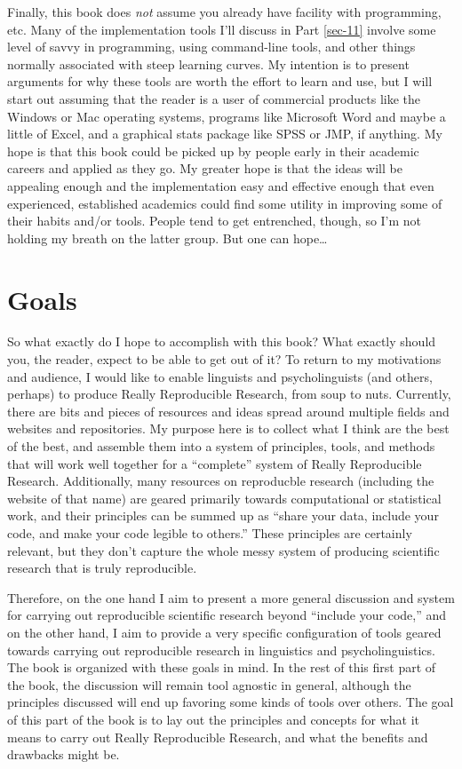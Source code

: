 \documentclass{book}
\begin{document}
Finally, this book does \emph{not} assume you already have facility with programming, etc. Many of the implementation tools I'll discuss in Part \ref{sec-11} involve some level of savvy in programming, using command-line tools, and other things normally associated with steep learning curves. My intention is to present arguments for why these tools are worth the effort to learn and use, but I will start out assuming that the reader is a user of commercial products like the Windows or Mac operating systems, programs like Microsoft Word and maybe a little of Excel, and a graphical stats package like SPSS or JMP, if anything.  My hope is that this book could be picked up by people early in their academic careers and applied as they go. My greater hope is that the ideas will be appealing enough and the implementation easy and effective enough that even experienced, established academics could find some utility in improving some of their habits and/or tools.  People tend to get entrenched, though, so I'm not holding my breath on the latter group.  But one can hope\ldots{}
\section{Goals}
\label{sec-2-2}

So what exactly do I hope to accomplish with this book?  What exactly should you, the reader, expect to be able to get out of it?  To return to my motivations and audience, I would like to enable linguists and psycholinguists (and others, perhaps) to produce Really Reproducible Research, from soup to nuts.  Currently, there are bits and pieces of resources and ideas spread around multiple fields and websites and repositories. My purpose here is to collect what I think are the best of the best, and assemble them into a system of principles, tools, and methods that will work well together for a ``complete'' system of Really Reproducible Research.  Additionally, many resources on reproducble research (including the website of that name) are geared primarily towards computational or statistical work, and their principles can be summed up as ``share your data, include your code, and make your code legible to others.'' These principles are certainly relevant, but they don't capture the whole messy system of producing scientific research that is truly reproducible.  

Therefore, on the one hand I aim to present a more general discussion and system for carrying out reproducible scientific research beyond ``include your code,'' and on the other hand, I aim to provide a very specific configuration of tools geared towards carrying out reproducible research in linguistics and psycholinguistics.  The book is organized with these goals in mind.  In the rest of this first part of the book, the discussion will remain tool agnostic in general, although the principles discussed will end up favoring some kinds of tools over others.  The goal of this part of the book is to lay out the principles and concepts for what it means to carry out Really Reproducible Research, and what the benefits and drawbacks might be.  
\end{document}
